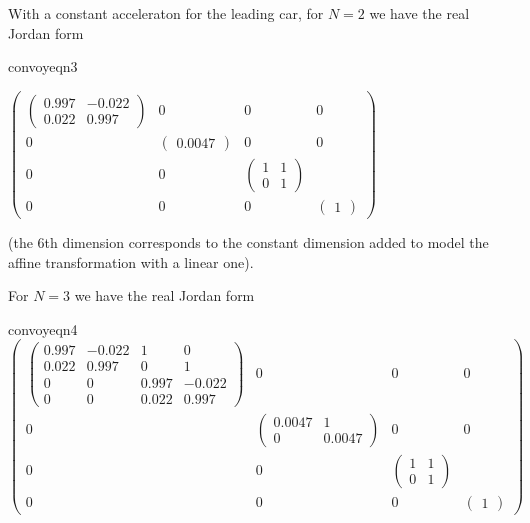 \documentclass[a4paper,11pt]{article}
\begin{document}
With a constant acceleraton for the leading car, for $N=2$ we have
the real Jordan form
\begin{center}
\begin{gif}[][130][130]{convoyeqn3}\boldmath

  $
 \begin{pmatrix}
    \begin{pmatrix}
      0.997 & -0.022 \\
      0.022 & 0.997
    \end{pmatrix} & 0 & 0 & 0 \\
    0 & \begin{pmatrix}0.0047\end{pmatrix} & 0 & 0\\
    0&0&
    \begin{pmatrix}
      1 & 1 \\
      0 & 1
    \end{pmatrix} \\
    0&0&0& \begin{pmatrix}1\end{pmatrix}
  \end{pmatrix}
  $
\end{gif}
\end{center}
(the 6th dimension corresponds to the constant dimension added to
model the affine transformation with a linear one).

For $N=3$ we have
the real Jordan form
\begin{center}
\begin{gif}[][130][130]{convoyeqn4}\boldmath
  $
  \begin{pmatrix}
    \begin{pmatrix}
      0.997 & -0.022 & 1 & 0 \\
      0.022 & 0.997 & 0 & 1  \\
      0 & 0 & 0.997 & -0.022  \\
      0 & 0 & 0.022 & 0.997
    \end{pmatrix} & 0 & 0 & 0\\
    0 & \begin{pmatrix}
      0.0047 & 1 \\
      0 & 0.0047
    \end{pmatrix} & 0 & 0 \\
    0&0&
    \begin{pmatrix}
      1 & 1 \\
      0 & 1
    \end{pmatrix} \\
    0&0&0& \begin{pmatrix}1\end{pmatrix}
  \end{pmatrix}
  $
\end{gif}
\end{center}
\end{document}
